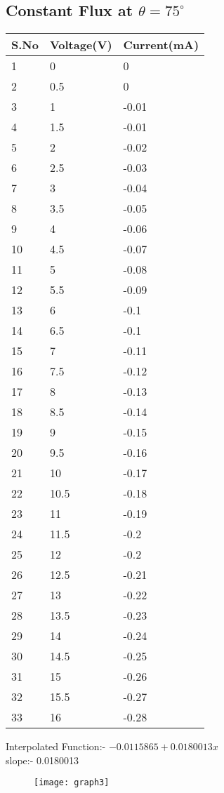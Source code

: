 \documentclass[
	letterpaper, %
	10pt, %
]{CSUniSchoolLabReport}
\begin{document}
	\subsection{Constant Flux at \(\theta = 75^{\circ}\) }
	\begin{center}
	\begin{tabular}{ | m{1cm} | m{3cm}| m{3cm} | } 
	\hline
	S.No & Voltage(V) & Current(mA) \\
	\hline
	1&0&0\\
	2&0.5&0\\
	3&1&-0.01\\
	4&1.5&-0.01\\
	5&2&-0.02\\
	6&2.5&-0.03\\
	7&3&-0.04\\
	8&3.5&-0.05\\
	9&4&-0.06\\
	10&4.5&-0.07\\
	11&5&-0.08\\
	12&5.5&-0.09\\
	13&6&-0.1\\
	14&6.5&-0.1\\
	15&7&-0.11\\
	16&7.5&-0.12\\
	17&8&-0.13\\
	18&8.5&-0.14\\
	19&9&-0.15\\
	20&9.5&-0.16\\
	21&10&-0.17\\
	22&10.5&-0.18\\
	23&11&-0.19\\
	24&11.5&-0.2\\
	25&12&-0.2\\
	26&12.5&-0.21\\
	27&13&-0.22\\
	28&13.5&-0.23\\
	29&14&-0.24\\
	30&14.5&-0.25\\
	31&15&-0.26\\
	32&15.5&-0.27\\
	33&16&-0.28\\
	\hline

	\end{tabular}
	\end{center}
	Interpolated Function:- \(-0.0115865 + 0.0180013 x\) \\
	slope:- 0.0180013 
	\begin{figure}[H] %
		\centering %
		\texttt{[image: graph3]} %
		\caption{}
	\end{figure}
\end{document}
